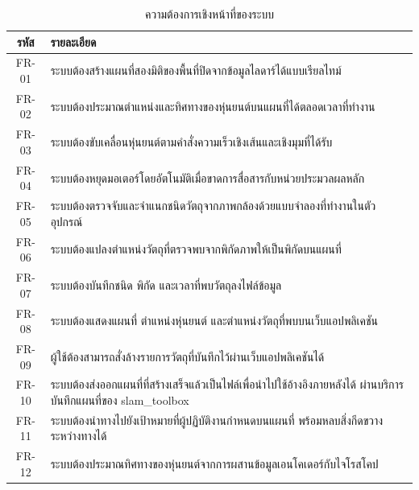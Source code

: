 \documentclass[a4paper,12pt]{report}
\begin{document}
\begin{table}[htbp]
\centering
\caption[ความต้องการเชิงหน้าที่ของระบบ (บทที่ 3)]{ความต้องการเชิงหน้าที่ของระบบ}
\label{tab:fr}
\small
\begin{tabularx}{\textwidth}{|c|X|}
\hline
\textbf{รหัส} & \textbf{รายละเอียด} \\
\hline
FR-01 & ระบบต้องสร้างแผนที่สองมิติของพื้นที่ปิดจากข้อมูลไลดาร์ได้แบบเรียลไทม์ \\
\hline
FR-02 & ระบบต้องประมาณตำแหน่งและทิศทางของหุ่นยนต์บนแผนที่ได้ตลอดเวลาที่ทำงาน \\
\hline
FR-03 & ระบบต้องขับเคลื่อนหุ่นยนต์ตามคำสั่งความเร็วเชิงเส้นและเชิงมุมที่ได้รับ \\
\hline
FR-04 & ระบบต้องหยุดมอเตอร์โดยอัตโนมัติเมื่อขาดการสื่อสารกับหน่วยประมวลผลหลัก \\
\hline
FR-05 & ระบบต้องตรวจจับและจำแนกชนิดวัตถุจากภาพกล้องด้วยแบบจำลองที่ทำงานในตัวอุปกรณ์ \\
\hline
FR-06 & ระบบต้องแปลงตำแหน่งวัตถุที่ตรวจพบจากพิกัดภาพให้เป็นพิกัดบนแผนที่ \\
\hline
FR-07 & ระบบต้องบันทึกชนิด พิกัด และเวลาที่พบวัตถุลงไฟล์ข้อมูล \\
\hline
FR-08 & ระบบต้องแสดงแผนที่ ตำแหน่งหุ่นยนต์ และตำแหน่งวัตถุที่พบบนเว็บแอปพลิเคชัน \\
\hline
FR-09 & ผู้ใช้ต้องสามารถสั่งล้างรายการวัตถุที่บันทึกไว้ผ่านเว็บแอปพลิเคชันได้ \\
\hline
FR-10 & ระบบต้องส่งออกแผนที่ที่สร้างเสร็จแล้วเป็นไฟล์เพื่อนำไปใช้อ้างอิงภายหลังได้
        ผ่านบริการบันทึกแผนที่ของ slam\_toolbox \\
\hline
FR-11 & ระบบต้องนำทางไปยังเป้าหมายที่ผู้ปฏิบัติงานกำหนดบนแผนที่
        พร้อมหลบสิ่งกีดขวางระหว่างทางได้ \\
\hline
FR-12 & ระบบต้องประมาณทิศทางของหุ่นยนต์จากการผสานข้อมูลเอนโคเดอร์กับไจโรสโคป \\
\hline
\end{tabularx}
\end{table}
\end{document}

